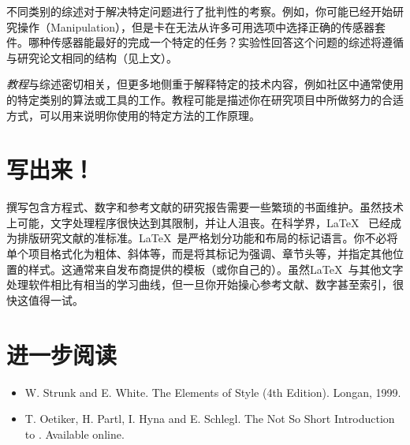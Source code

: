 不同类别的综述对于解决特定问题进行了批判性的考察。例如，你可能已经开始研究操作（Manipulation），但是卡在无法从许多可用选项中选择正确的传感器套件。哪种传感器能最好的完成一个特定的任务？实验性回答这个问题的综述将遵循与研究论文相同的结构（见上文）。


\emph{教程}与综述密切相关，但更多地侧重于解释特定的技术内容，例如社区中通常使用的特定类别的算法或工具的工作。教程可能是描述你在研究项目中所做努力的合适方式，可以用来说明你使用的特定方法的工作原理。


\section{写出来！}
撰写包含方程式、数字和参考文献的研究报告需要一些繁琐的书面维护。虽然技术上可能，文字处理程序很快达到其限制，并让人沮丧。在科学界，\LaTeX~ 已经成为排版研究文献的准标准。\LaTeX~是严格划分功能和布局的标记语言。你不必将单个项目格式化为粗体、斜体等，而是将其标记为强调、章节头等，并指定其他位置的样式。这通常来自发布商提供的模板（或你自己的）。虽然\LaTeX~与其他文字处理软件相比有相当的学习曲线，但一旦你开始操心参考文献、数字甚至索引，很快这值得一试。

\section*{进一步阅读}

\begin{itemize}
\item W. Strunk and E. White. The Elements of Style (4th Edition). Longan, 1999.
\item T. Oetiker, H. Partl, I. Hyna and E. Schlegl. The Not So Short Introduction to \LaTeXe. Available online.
\end{itemize}

